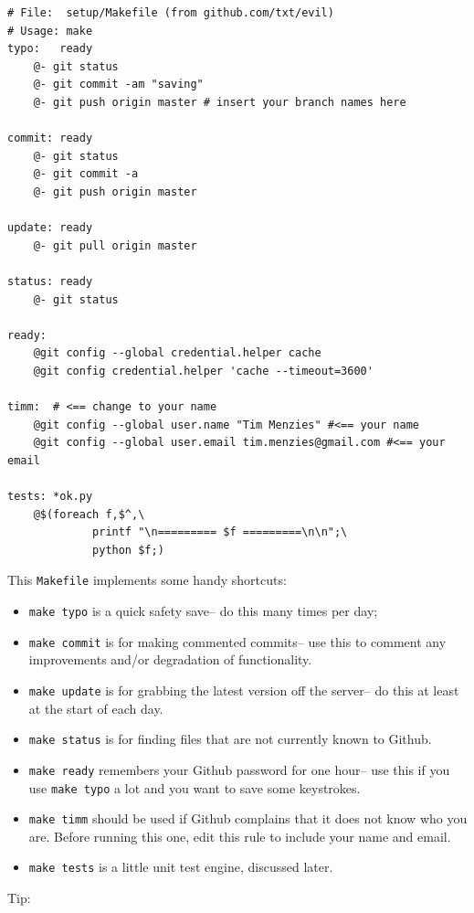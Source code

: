 \begin{lstlisting}
# File:  setup/Makefile (from github.com/txt/evil)
# Usage: make
typo:   ready
    @- git status
    @- git commit -am "saving"
    @- git push origin master # insert your branch names here

commit: ready
    @- git status
    @- git commit -a
    @- git push origin master

update: ready
    @- git pull origin master

status: ready
    @- git status

ready:
    @git config --global credential.helper cache
    @git config credential.helper 'cache --timeout=3600'

timm:  # <== change to your name
    @git config --global user.name "Tim Menzies" #<== your name
    @git config --global user.email tim.menzies@gmail.com #<== your email

tests: *ok.py
    @$(foreach f,$^,\
             printf "\n========= $f =========\n\n";\
             python $f;)
\end{lstlisting}

This \texttt{Makefile} implements some handy shortcuts:

\begin{itemize}
\itemsep1pt\parskip0pt
\item
  \texttt{make\ typo} is a quick safety save-- do this many times per
  day;
\item
  \texttt{make\ commit} is for making commented commits-- use this to
  comment any improvements and/or degradation of functionality.
\item
  \texttt{make\ update} is for grabbing the latest version off the
  server-- do this at least at the start of each day.
\item
  \texttt{make\ status} is for finding files that are not currently
  known to Github.
\item
  \texttt{make\ ready} remembers your Github password for one hour-- use
  this if you use \texttt{make\ typo} a lot and you want to save some
  keystrokes.
\item
  \texttt{make\ timm} should be used if Github complains that it does
  not know who you are. Before running this one, edit this rule to
  include your name and email.
\item
  \texttt{make\ tests} is a little unit test engine, discussed later.
\end{itemize}

Tip:

